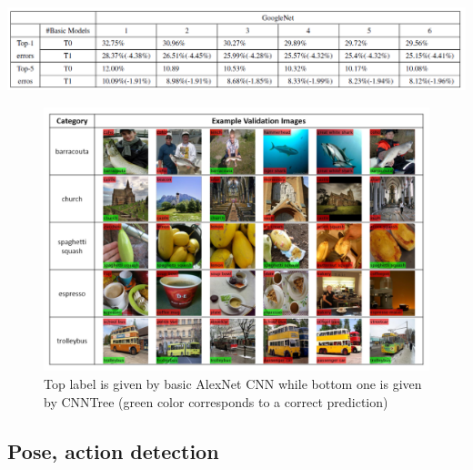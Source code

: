 \begin{frame}[allowframebreaks]
\begin{center}
	\includegraphics[scale=0.7]{figs/CNNTree_results2.PNG}
\end{center}

\framebreak

\begin{figure}
	
\begin{center}
	\includegraphics[scale=0.55]{figs/CNNTree_imageclassification}
\end{center}
\caption{Top label is given by basic AlexNet CNN while bottom one is given by CNNTree (green color corresponds to a correct prediction)}
\end{figure}

\end{frame}


\subsection{Pose, action detection}


